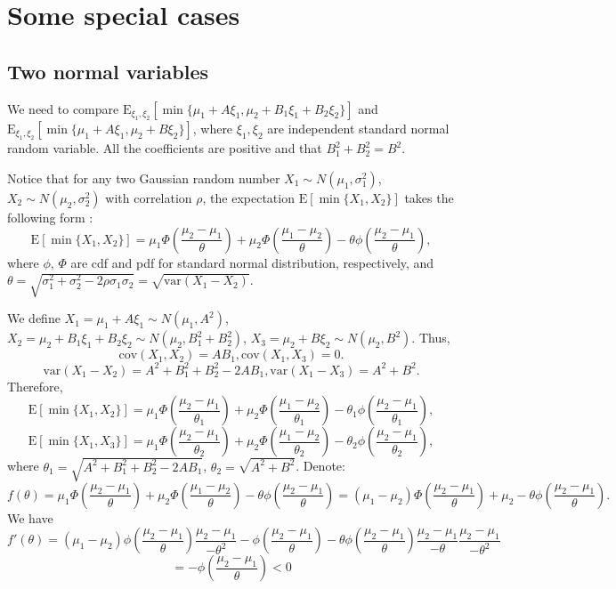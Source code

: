 \documentclass[opre,sglanonrev]{informs4}
\begin{document}
\section{Some special cases}
\subsection{Two normal variables}
We need to compare $\text{E}_{\xi_1, \xi_2}[\min \{\mu_1+A\xi_1, \mu_2+B_1\xi_1+B_2\xi_2 \}]$ and $\text{E}_{\xi_1, \xi_2}[\min \{\mu_1+A\xi_1, \mu_2+B\xi_2 \}]$, where $\xi_1, \xi_2$ are independent standard normal random variable. All the coefficients are positive and that $B_1^2+B_2^2=B^2$.

Notice that for any two Gaussian random number $X_1\sim N(\mu_1,\sigma^2_1)$, $X_2\sim N(\mu_2,\sigma^2_2)$ with correlation $\rho$, the expectation $\text{E}[\min\{X_1, X_2\}]$ takes the following form \citep{clark1961greatest}:
$$
\text{E}[\min\{X_1, X_2\}] = \mu_1\Phi(\frac{\mu_2-\mu_1}{\theta}) + \mu_2\Phi(\frac{\mu_1-\mu_2}{\theta}) - \theta \phi(\frac{\mu_2-\mu_1}{\theta} ),
$$
where $\phi$, $\Phi$ are cdf and pdf for standard normal distribution, respectively, and $\theta = \sqrt{\sigma^2_1+\sigma^2_2-2\rho \sigma_1\sigma_2} = \sqrt{\text{var}(X_1-X_2)}$.

We define $X_1=\mu_1+A\xi_1 \sim N(\mu_1, A^2)$, $X_2=\mu_2+B_1\xi_1+B_2\xi_2 \sim N(\mu_2, B_1^2+B_2^2)$, $X_3=\mu_2+B\xi_2 \sim N(\mu_2,B^2)$. Thus, 
$$
\text{cov}(X_1, X_2) = AB_1, \text{cov}(X_1, X_3) = 0.
$$
$$
\text{var}(X_1-X_2) = A^2+B_1^2+B_2^2-2AB_1, \text{var}(X_1- X_3) =A^2+B^2.
$$
Therefore,
$$
\text{E}[\min\{X_1, X_2\}]= \mu_1\Phi(\frac{\mu_2-\mu_1}{\theta_1}) + \mu_2\Phi(\frac{\mu_1-\mu_2}{\theta_1}) - \theta_1 \phi(\frac{\mu_2-\mu_1}{\theta_1} ),
$$
$$
\text{E}[\min\{X_1, X_3\}]= \mu_1\Phi(\frac{\mu_2-\mu_1}{\theta_2}) + \mu_2\Phi(\frac{\mu_1-\mu_2}{\theta_2}) - \theta_2 \phi(\frac{\mu_2-\mu_1}{\theta_2} ),
$$
where $\theta_1=\sqrt{A^2+B_1^2+B_2^2-2AB_1}$, $\theta_2=\sqrt{A^2+B^2}$.
Denote:
$$
f(\theta) =  \mu_1\Phi(\frac{\mu_2-\mu_1}{\theta}) + \mu_2\Phi(\frac{\mu_1-\mu_2}{\theta}) - \theta \phi(\frac{\mu_2-\mu_1}{\theta} ) = (\mu_1-\mu_2)\Phi(\frac{\mu_2-\mu_1}{\theta}) +\mu_2- \theta \phi(\frac{\mu_2-\mu_1}{\theta} ).
$$
We have
$$
	f'(\theta) = (\mu_1-\mu_2)\phi(\frac{\mu_2-\mu_1}{\theta})\frac{\mu_2-\mu_1}{-\theta^2}-\phi(\frac{\mu_2-\mu_1}{\theta})-\theta\phi(\frac{\mu_2-\mu_1}{\theta})\frac{\mu_2-\mu_1}{-\theta} \frac{\mu_2-\mu_1}{-\theta^2}
$$
$$
 =-\phi(\frac{\mu_2-\mu_1}{\theta}) <0
$$
\end{document}
